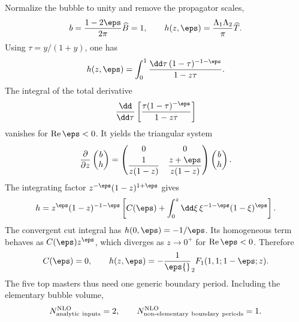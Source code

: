 Normalize the bubble to unity and remove the propagator scales,
\begin{equation}
 b=\frac{1-2\eps}{2\pi}\widehat B=1,
 \qquad
 h(z,\eps)=\frac{\Lambda_1\Lambda_2}{\pi}\widehat T.
 \label{eq:nlo-normalized-bubble-top}
\end{equation}
Using $\tau=y/(1+y)$, one has
\begin{equation}
 h(z,\eps)=\int_0^1\frac{\dd\tau\,(1-\tau)^{-1-\eps}}
 {1-z\tau}.
 \label{eq:nlo-euler-integral}
\end{equation}
The integral of the total derivative
\begin{equation}
 \frac{\dd}{\dd\tau}
 \left[\frac{\tau(1-\tau)^{-\eps}}{1-z\tau}\right]
 \label{eq:nlo-angular-total-derivative}
\end{equation}
vanishes for $\operatorname{Re}\eps<0$.  It yields the triangular system
\begin{equation}
 \frac{\partial}{\partial z}
 \begin{pmatrix}b\\h\end{pmatrix}
 =
 \begin{pmatrix}
 0&0\\[1mm]
 \dfrac{1}{z(1-z)}&\dfrac{z+\eps}{z(1-z)}
 \end{pmatrix}
 \begin{pmatrix}b\\h\end{pmatrix}.
 \label{eq:nlo-triangular-system}
\end{equation}
The integrating factor $z^{-\eps}(1-z)^{1+\eps}$ gives
\begin{equation}
 h=z^\eps(1-z)^{-1-\eps}
 \left[C(\eps)+\int_0^z\dd\xi\,
 \xi^{-1-\eps}(1-\xi)^\eps\right].
 \label{eq:nlo-general-de-solution}
\end{equation}
The convergent cut integral has
$h(0,\eps)=-1/\eps$.  Its homogeneous term behaves as
$C(\eps)z^\eps$, which diverges as $z\to0^+$ for
$\operatorname{Re}\eps<0$.  Therefore
\begin{equation}
 C(\eps)=0,
 \qquad
 h(z,\eps)=-\frac1\eps{}_2F_1(1,1;1-\eps;z).
 \label{eq:nlo-physical-de-solution}
\end{equation}
The five top masters thus need one generic boundary period.  Including the
elementary bubble volume,
\begin{equation}
 N_{\rm analytic\ inputs}^{\rm NLO}=2,
 \qquad
 N_{\rm non\text{-}elementary\ boundary\ periods}^{\rm NLO}=1.
 \label{eq:nlo-boundary-count}
\end{equation}

